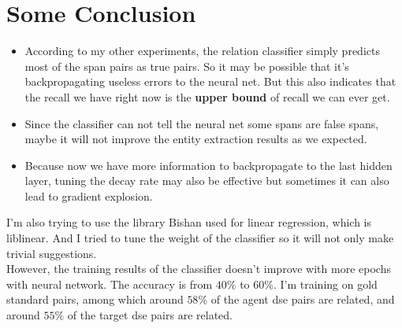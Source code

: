 \documentclass[a4paper, 12pt]{article}
\begin{document}
 \section{Some Conclusion}
 \begin{itemize}
\item
  According to my other experiments, the relation classifier simply predicts most
  of the span pairs as true pairs. So it may be possible that it's backpropagating
  useless errors to the neural net. But this also indicates that the recall we
  have right now is the \textbf{upper bound} of recall we can ever get.\\

\item
  Since the classifier can not tell the neural net some spans are false spans,
  maybe it will not improve the entity extraction results as we expected. \\

\item
  Because now we have more information to backpropagate to the last hidden
  layer, tuning the decay rate may also be effective but sometimes it can also
  lead to gradient explosion.
 \end{itemize}
  I'm also trying to use the library Bishan used for linear regression, which is 
  liblinear. And I tried to tune the weight of the classifier so it will not
  only make trivial suggestions.\\
  However, the training results of the classifier doesn't improve with more
  epochs with neural network. The accuracy is from $40\%$ to $60\%$. I'm
  training on gold standard pairs, among which around $58\%$ of the agent dse pairs are
  related, and around $55\%$ of the target dse pairs are related.\\
\end{document}

